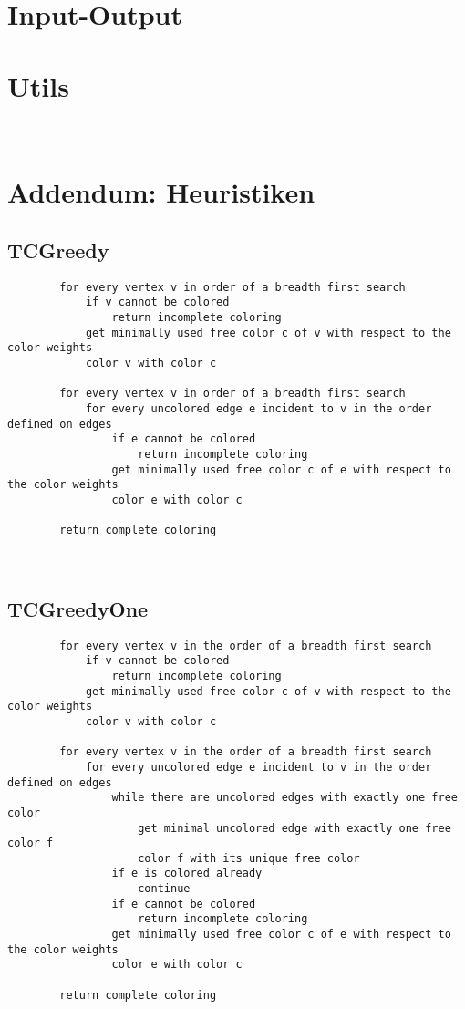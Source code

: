\documentclass{article}
\begin{document}
	\section{Input-Output}
	\section{Utils}
	
	~\newpage
	
	\section{Addendum: Heuristiken}
	\subsection{TCGreedy}
	\begin{verbatim}
		for every vertex v in order of a breadth first search
		    if v cannot be colored
		        return incomplete coloring
		    get minimally used free color c of v with respect to the color weights
		    color v with color c
				    
		for every vertex v in order of a breadth first search
		    for every uncolored edge e incident to v in the order defined on edges
		        if e cannot be colored
		            return incomplete coloring
		        get minimally used free color c of e with respect to the color weights
		        color e with color c
				        
		return complete coloring
	\end{verbatim}
	
	~\newpage
	
	\subsection{TCGreedyOne}
	\begin{verbatim}
		for every vertex v in the order of a breadth first search
		    if v cannot be colored
		        return incomplete coloring
		    get minimally used free color c of v with respect to the color weights
		    color v with color c
				    
		for every vertex v in the order of a breadth first search
		    for every uncolored edge e incident to v in the order defined on edges
		        while there are uncolored edges with exactly one free color
		            get minimal uncolored edge with exactly one free color f
		            color f with its unique free color
		        if e is colored already
		            continue
		        if e cannot be colored
		            return incomplete coloring
		        get minimally used free color c of e with respect to the color weights
		        color e with color c
				        
		return complete coloring
	\end{verbatim}
	
\end{document}
